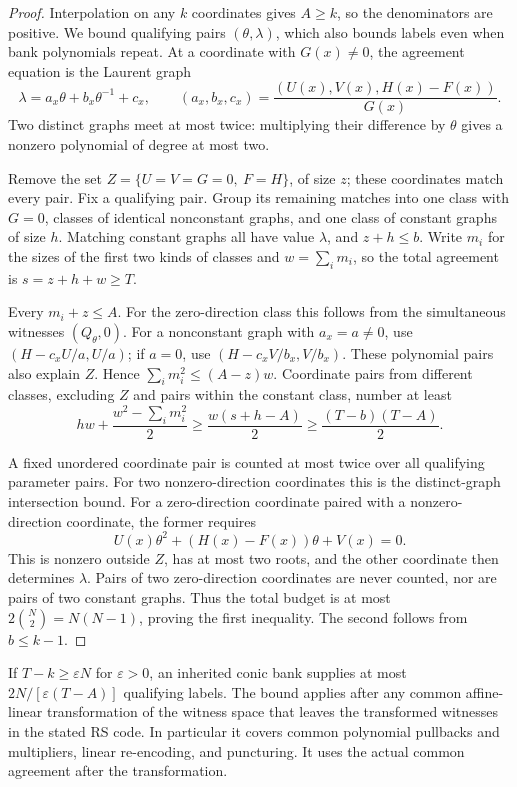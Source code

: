\begin{proof}
Interpolation on any $k$ coordinates gives $A\ge k$, so the denominators
are positive. We bound qualifying pairs $(\theta,\lambda)$, which also
bounds labels even when bank polynomials repeat.
At a coordinate with $G(x)\ne0$, the agreement equation is the Laurent graph
\[
 \lambda=a_x\theta+b_x\theta^{-1}+c_x,\qquad
 (a_x,b_x,c_x)=\frac{(U(x),V(x),H(x)-F(x))}{G(x)}.
\]
Two distinct graphs meet at most twice: multiplying their difference by
$\theta$ gives a nonzero polynomial of degree at most two.

Remove the set $Z=\{U=V=G=0,\ F=H\}$, of size $z$; these coordinates
match every pair. Fix a qualifying pair. Group its remaining matches into
one class with $G=0$, classes of identical nonconstant graphs, and one
class of constant graphs of size $h$. Matching constant graphs all have
value $\lambda$, and $z+h\le b$.
Write $m_i$ for the sizes of the first two kinds of classes and
$w=\sum_i m_i$, so the total agreement is $s=z+h+w\ge T$.

Every $m_i+z\le A$. For the zero-direction class this follows from the
simultaneous witnesses $(Q_\theta,0)$. For a nonconstant graph with
$a_x=a\ne0$, use $(H-c_xU/a,U/a)$; if $a=0$, use
$(H-c_xV/b_x,V/b_x)$. These polynomial pairs also explain $Z$.
Hence $\sum_i m_i^2\le(A-z)w$. Coordinate pairs from different classes,
excluding $Z$ and pairs within the constant class, number at least
\[
 hw+\frac{w^2-\sum_i m_i^2}{2}
 \ge\frac{w(s+h-A)}2
 \ge\frac{(T-b)(T-A)}2.
\]

A fixed unordered coordinate pair is counted at most twice over all
qualifying parameter pairs. For two nonzero-direction coordinates this
is the distinct-graph intersection bound. For a zero-direction coordinate
paired with a nonzero-direction coordinate, the former requires
\[
 U(x)\theta^2+(H(x)-F(x))\theta+V(x)=0.
\]
This is nonzero outside $Z$, has at most two roots, and the other coordinate
then determines $\lambda$. Pairs of two zero-direction coordinates are
never counted, nor are pairs of two constant graphs. Thus the total budget
is at most $2\binom N2=N(N-1)$, proving the first inequality.
The second follows from $b\le k-1$.
\end{proof}

\begin{corollary}\label{cor:conic-bank-fixed-rate}
If $T-k\ge\varepsilon N$ for $\varepsilon>0$, an inherited conic bank
supplies at most $2N/[\varepsilon(T-A)]$ qualifying labels.
The bound applies after any common affine-linear transformation of the
witness space that leaves the transformed witnesses in the stated RS code.
In particular it covers common polynomial pullbacks and multipliers,
linear re-encoding, and puncturing. It uses the actual common agreement
after the transformation.
\end{corollary}

